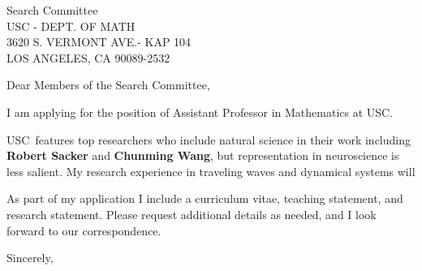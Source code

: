 \documentclass[11pt,a4paper]{letter}
\begin{document}

\def\School{USC}

\begin{letter}
{Search Committee\\
USC - DEPT. OF MATH\\
3620 S. VERMONT AVE.- KAP 104\\
LOS ANGELES, CA 90089-2532}


\opening{Dear Members of the Search Committee,}

I am applying for the position of Assistant Professor in Mathematics at \School. 



\School~features top researchers who include natural science in their work including \textbf{Robert Sacker} and \textbf{Chunming Wang}, but representation in neuroscience is less salient. My research experience in traveling waves and dynamical systems will 



As part of my application I include a curriculum vitae, teaching statement, and research statement. Please request additional details as needed, and I look forward to our correspondence.

\closing{Sincerely,}
\end{letter}
\end{document}
